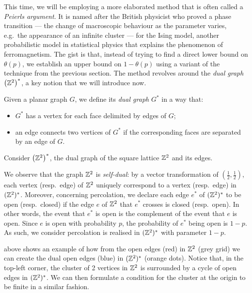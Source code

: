 \documentclass[a4paper, 12pt]{article}
\begin{document}
This time, we will be employing a more elaborated method that is often called a \textit{Peierls argument}. It is named after the British physicist who proved a phase transition --- the change of macroscopic behaviour as the parameter varies, e.g.\ the appearance of an infinite cluster --- for the Ising model, another probabilistic model in statistical physics that explains the phenomenon of ferromagnetism. The gist is that, instead of trying to find a direct lower bound on $\theta(p)$, we establish an upper bound on $1 - \theta(p)$ using a variant of the technique from the previous section. The method revolves around the \textit{dual graph} $\left(\mathbb{Z}^2\right)^*$, a key notion that we will introduce now.

\begin{defn}\label{defn:dual_graph}
Given a planar graph $G$, we define its \textit{dual graph} $G^*$ in a way that:
\begin{itemize}
    \item $G^*$ has a vertex for each face delimited by edges of $G$;
    \item an edge connects two vertices of $G^*$ if the corresponding faces are separated by an edge of $G$.
\end{itemize}
\end{defn}
\begin{ex}\label{ex:dual_lattice}
Consider $\left(\mathbb{Z}^2\right)^*$, the dual graph of the square lattice $\mathbb{Z}^2$ and its edges.


We observe that the graph $\mathbb{Z}^2$ is \textit{self-dual}: by a vector transformation of $(\frac{1}{2}, \frac{1}{2})$, each vertex (resp.\ edge) of $\mathbb{Z}^2$ uniquely correspond to a vertex (resp.\ edge) in $(\mathbb{Z}^2)^*$. Moreover, concerning percolation, we declare each edge $e^*$ of $(\mathbb{Z}^2)^*$ to be open (resp.\ closed) if the edge $e$ of $\mathbb{Z}^2$ that $e^*$ crosses is closed (resp.\ open). In other words, the event that $e^*$ is open is the complement of the event that $e$ is open. Since $e$ is open with probability $p$, the probability of $e^*$ being open is $1 - p$. As such, we consider percolation is realised in $(\mathbb{Z}^2)^*$ with parameter $1 - p$.

 above shows an example of how from the open edges (red) in $\mathbb{Z}^2$ (grey grid) we can create the dual open edges (blue) in $(\mathbb{Z}^2)^*$ (orange dots). Notice that, in the top-left corner, the cluster of 2 vertices in $\mathbb{Z}^2$ is surrounded by a cycle of open edges in $(\mathbb{Z}^2)^*$. We can then formulate a condition for the cluster at the origin to be finite in a similar fashion.
\end{ex}
\end{document}
